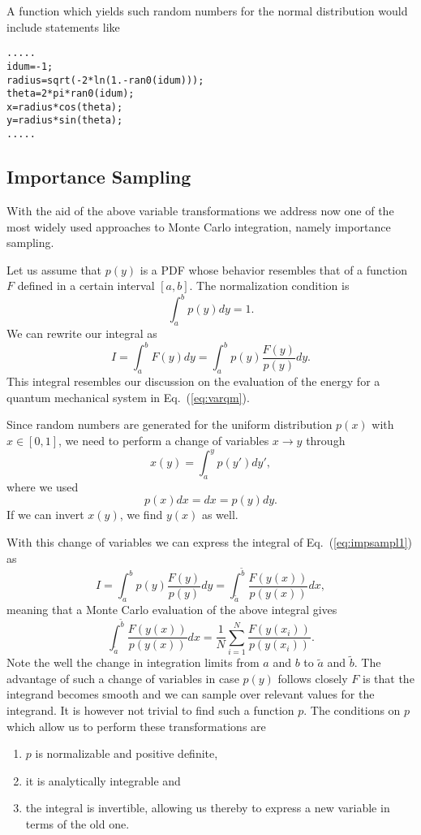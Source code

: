 A function which yields such random numbers for the normal
distribution would include statements like 
\begin{lstlisting}
.....
idum=-1;
radius=sqrt(-2*ln(1.-ran0(idum)));
theta=2*pi*ran0(idum);
x=radius*cos(theta);
y=radius*sin(theta);
.....
\end{lstlisting}




\subsection{Importance Sampling}


With the aid of the above variable transformations we address now
one of the most widely used approaches to Monte Carlo integration,
namely importance sampling. 

Let us assume that  $p(y)$ is a PDF whose behavior resembles that of a function
$F$ defined in a certain interval $[a,b]$. The normalization condition is
\[
   \int_a^bp(y)dy=1.
\]
We can rewrite our integral as 
\[
   I=\int_a^b F(y) dy =\int_a^b p(y)\frac{F(y)}{p(y)} dy.
   \label{eq:impsampl1}
\]
This integral resembles our discussion on the evaluation of
the energy for a quantum mechanical system in Eq.~(\ref{eq:varqm}). 

Since random numbers are generated for the uniform distribution $p(x)$
with $x\in [0,1]$, we need to perform a change of variables $x\rightarrow y$
through
\[
     x(y)=\int_a^y p(y')dy',
\]
where we used 
\[
   p(x)dx=dx=p(y)dy. 
\] 
If we can invert $x(y)$, we find $y(x)$ as well.

With this change of variables we can express the integral of 
Eq.~(\ref{eq:impsampl1}) as 
\[
   I=\int_a^b p(y)\frac{F(y)}{p(y)} dy=\int_{\tilde{a}}^{\tilde{b}}\frac{F(y(x))}{p(y(x))} dx,
\]
meaning that a Monte Carlo evaluation of the above integral gives
\[
\int_{\tilde{a}}^{\tilde{b}}\frac{F(y(x))}{p(y(x))} dx=
\frac{1}{N}\sum_{i=1}^N\frac{F(y(x_i))}{p(y(x_i))}.
\]
Note the well the change in integration limits from $a$ and $b$ to $\tilde{a}$ and 
$\tilde{b}$.
The advantage of such a change of variables in case $p(y)$ follows
closely $F$ is that the integrand becomes smooth and we can sample
over relevant values for the integrand. It is however not trivial
to find such a function $p$.
The conditions on $p$ which allow us to perform these transformations
are
\begin{enumerate}
\item $p$ is normalizable and positive definite, 
\item it is analytically integrable and 
\item the integral is invertible, allowing us thereby 
      to express a new variable in terms of the old one. 
\end{enumerate}

